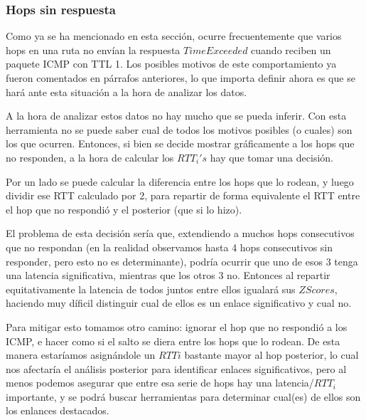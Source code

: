 
\subsubsection*{Hops sin respuesta}
\par Como ya se ha mencionado en esta secci\'on, ocurre frecuentemente que
varios hops en una ruta no env\'ian la respuesta $TimeExceeded$ cuando reciben
un paquete ICMP con TTL 1. Los posibles motivos de este comportamiento ya fueron
comentados en p\'arrafos anteriores, lo que importa definir ahora es que
se har\'a ante esta situaci\'on a la hora de analizar los datos.

\par A la hora de analizar estos datos no hay mucho que se pueda inferir. Con
esta herramienta no se puede saber cual de todos los motivos posibles (o cuales)
son los que ocurren. Entonces, si bien se decide mostrar gr\'aficamente a
los hops que no responden, a la hora de calcular los $RTT_i's$ hay que tomar
una decisi\'on.

\par Por un lado se puede calcular la diferencia entre los hops que lo rodean,
y luego dividir ese RTT calculado por 2, para repartir de forma equivalente el
RTT entre el hop que no respondi\'o y el posterior (que si lo hizo).

\par El problema de esta decisi\'on ser\'ia que, extendiendo a muchos hops consecutivos
que no respondan (en la realidad observamos hasta 4 hops consecutivos sin responder,
pero esto no es determinante), podr\'ia ocurrir que uno de esos 3 tenga una
latencia significativa, mientras que los otros 3 no. Entonces al repartir equitativamente
la latencia de todos juntos entre ellos igualar\'a sus $ZScores$, haciendo muy
d\'ificil distinguir cual de ellos es un enlace significativo y cual no.

\par Para mitigar esto tomamos otro camino: ignorar el hop que no respondi\'o a los ICMP, e
hacer como si el salto se diera entre los hops que lo rodean. De esta manera
estar\'iamos asign\'andole un $RTTi$ bastante mayor al
hop posterior, lo cual nos afectar\'ia el an\'alisis posterior para identificar
enlaces significativos, pero al menos podemos asegurar que entre esa serie de hops
hay una latencia/$RTT_i$ importante, y se podr\'a buscar herramientas para determinar
cual(es) de ellos son los enlances destacados.

